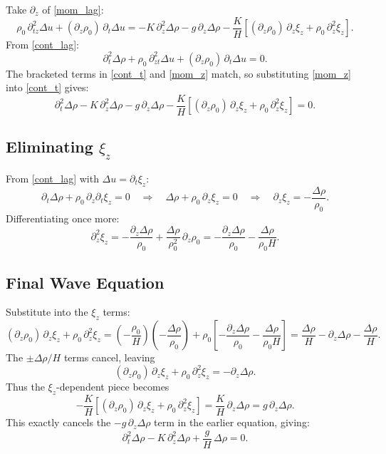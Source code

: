 Take $\partial_z$ of \eqref{mom_lag}:
\begin{equation}
\rho_0 \, \partial_{tz}^2 \Delta u + (\partial_z\rho_0)\, \partial_t \Delta u
= -K \, \partial_z^2 \Delta\rho - g \, \partial_z \Delta\rho - \frac{K}{H} \left[ (\partial_z\rho_0)\,\partial_z\xi_z + \rho_0\,\partial_z^2 \xi_z \right].
\label{mom_z}
\end{equation}
From \eqref{cont_lag}:
\begin{equation}
\partial_t^2 \Delta\rho + \rho_0 \, \partial_{zt}^2 \Delta u + (\partial_z\rho_0)\, \partial_t \Delta u = 0.
\label{cont_t}
\end{equation}
The bracketed terms in \eqref{cont_t} and \eqref{mom_z} match, so substituting \eqref{mom_z} into \eqref{cont_t} gives:
\[
\partial_t^2 \Delta\rho - K \, \partial_z^2 \Delta\rho - g \, \partial_z \Delta\rho - \frac{K}{H} \left[ (\partial_z\rho_0)\,\partial_z\xi_z + \rho_0\,\partial_z^2 \xi_z \right] = 0.
\]

\subsection*{Eliminating $\xi_z$}

From \eqref{cont_lag} with $\Delta u = \partial_t \xi_z$:
\[
\partial_t \Delta\rho + \rho_0 \, \partial_z \partial_t \xi_z = 0
\quad\Rightarrow\quad
\Delta\rho + \rho_0 \, \partial_z \xi_z = 0
\quad\Rightarrow\quad
\partial_z \xi_z = - \frac{\Delta\rho}{\rho_0}.
\]
Differentiating once more:
\[
\partial_z^2 \xi_z = -\frac{\partial_z \Delta\rho}{\rho_0} + \frac{\Delta\rho}{\rho_0^2} \,\partial_z\rho_0
= -\frac{\partial_z \Delta\rho}{\rho_0} - \frac{\Delta\rho}{\rho_0 H}.
\]

\subsection*{Final Wave Equation}

Substitute into the $\xi_z$ terms:
\[
(\partial_z\rho_0)\,\partial_z\xi_z + \rho_0\,\partial_z^2 \xi_z
= \left(-\frac{\rho_0}{H}\right)\left( -\frac{\Delta\rho}{\rho_0} \right)
+ \rho_0\left[ -\frac{\partial_z\Delta\rho}{\rho_0} - \frac{\Delta\rho}{\rho_0 H} \right]
= \frac{\Delta\rho}{H} - \partial_z\Delta\rho - \frac{\Delta\rho}{H}.
\]
The $\pm \Delta\rho/H$ terms cancel, leaving
\[
(\partial_z\rho_0)\,\partial_z\xi_z + \rho_0\,\partial_z^2 \xi_z = - \partial_z\Delta\rho.
\]
Thus the $\xi_z$-dependent piece becomes
\[
-\frac{K}{H}\left[ (\partial_z\rho_0)\,\partial_z\xi_z + \rho_0\,\partial_z^2\xi_z \right]
= \frac{K}{H} \, \partial_z\Delta\rho
= g\,\partial_z\Delta\rho.
\]
This exactly cancels the $-g\,\partial_z\Delta\rho$ term in the earlier equation, giving:
\begin{equation}
\boxed{
\partial_t^2 \Delta\rho - K \,\partial_z^2 \Delta\rho + \frac{g}{H}\,\Delta\rho = 0
}.
\end{equation}

